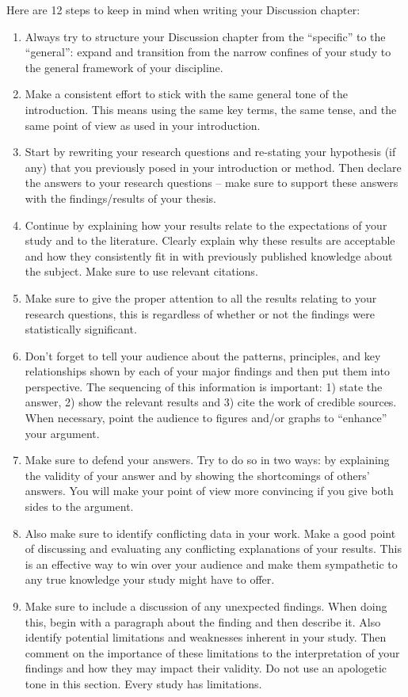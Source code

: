 Here are 12 steps to keep in mind when writing your Discussion chapter:
\begin{enumerate}
    \item Always try to structure your Discussion chapter from the ``specific'' to the ``general'': expand and transition from the narrow confines of your study to the general framework of your discipline.
    \item Make a consistent effort to stick with the same general tone of the introduction. This means using the same key terms, the same tense, and the same point of view as used in your introduction.
    \item Start by rewriting your research questions and re-stating your hypothesis (if any) that you previously posed in your introduction or method. Then declare the answers to your research questions -- make sure to support these answers with the findings/results of your thesis.
    \item Continue by explaining how your results relate to the expectations of your study and to the literature. Clearly explain why these results are acceptable and how they consistently fit in with previously published knowledge about the subject. Make sure to use relevant citations.
    \item Make sure to give the proper attention to all the results relating to your research questions, this is regardless of whether or not the findings were statistically significant.
    \item Don't forget to tell your audience about the patterns, principles, and key relationships shown by each of your major findings and then put them into perspective. The sequencing of this information is important: 1) state the answer, 2) show the relevant results and 3) cite the work of credible sources. When necessary, point the audience to figures and/or graphs to ``enhance'' your argument.
    \item Make sure to defend your answers. Try to do so in two ways: by explaining the validity of your answer and by showing the shortcomings of others' answers. You will make your point of view more convincing if you give both sides to the argument.
    \item Also make sure to identify conflicting data in your work. Make a good point of discussing and evaluating any conflicting explanations of your results. This is an effective way to win over your audience and make them sympathetic to any true knowledge your study might have to offer.
    \item Make sure to include a discussion of any unexpected findings. When doing this, begin with a paragraph about the finding and then describe it. Also identify potential limitations and weaknesses inherent in your study. Then comment on the importance of these limitations to the interpretation of your findings and how they may impact their validity. Do not use an apologetic tone in this section. Every study has limitations.

\end{enumerate}
